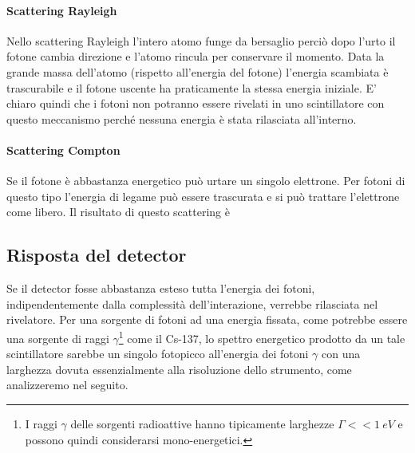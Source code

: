  \paragraph{Scattering Rayleigh}
 Nello scattering Rayleigh l'intero atomo funge da bersaglio perciò dopo l'urto il fotone cambia direzione e l'atomo rincula per conservare il momento. Data la grande massa dell'atomo (rispetto all'energia del fotone) l'energia scambiata è trascurabile e il fotone uscente ha praticamente la stessa energia iniziale. E' chiaro quindi che i fotoni non potranno essere rivelati in uno scintillatore con questo meccanismo perché nessuna energia è stata rilasciata all'interno.
 
 \paragraph{Scattering Compton}
 Se il fotone è abbastanza energetico può urtare un singolo elettrone. Per fotoni di questo tipo l'energia di legame può essere trascurata e si può trattare l'elettrone come libero. Il risultato di questo scattering è 
 
 \subsection{Risposta del detector}
 Se il detector fosse abbastanza esteso tutta l'energia dei fotoni, indipendentemente dalla complessità dell'interazione, verrebbe rilasciata nel rivelatore. Per una sorgente di fotoni ad una energia fissata, come potrebbe essere una sorgente di raggi $\gamma$\footnote{I raggi $\gamma$ delle sorgenti radioattive hanno tipicamente larghezze $\Gamma << \SI{1}{eV}$ e possono quindi considerarsi mono-energetici.} come il Cs-137, lo spettro energetico prodotto da un tale scintillatore sarebbe un singolo fotopicco all'energia dei fotoni $\gamma$ con una larghezza dovuta essenzialmente alla risoluzione dello strumento, come analizzeremo nel seguito.
 
